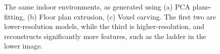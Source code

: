 \documentclass[]{spie}  %
\begin{document}
\begin{figure}
{  } 
  \caption{The same indoor environments, as generated using (a) PCA
    plane-fitting, (b) Floor plan extrusion, (c) Voxel carving. The
    first two are lower-resolution models, while the third is
    higher-resolution, and reconstructs significantly more features,
    such as the ladder in the lower image.}
  \label{fig:modelcomparisons}
\end{figure}
\end{document}

